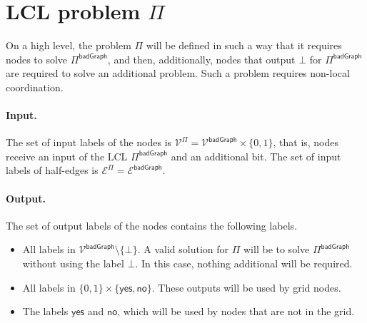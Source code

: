 \documentclass[11pt]{article}
\newcommand{\lbadgraph}{\mathsf {badGraph}}
\newcommand{\lyes}{\mathsf {yes}}
\newcommand{\lno}{\mathsf {no}}
\begin{document}
\section{LCL problem \texorpdfstring{\boldmath$\Pi$}{Pi}}\label{sec:problem-pi}
On a high level, the problem $\Pi$ will be defined in such a way that it requires nodes to solve $\Pi^{\lbadgraph}$, and then, additionally, nodes that output $\bot$ for $\Pi^{\lbadgraph}$ are required to solve an additional problem. Such a problem requires non-local coordination.

\paragraph{Input.}
The set of input labels of the nodes is $\mathcal{V}^\Pi=\mathcal{V^\lbadgraph}\times \{0,1\}$, that is, nodes receive an input of the LCL $\Pi^\lbadgraph$ and an additional bit. The set of input labels of half-edges is $\mathcal{E}^\Pi=\mathcal{E^\lbadgraph}$. 

\paragraph{Output.}
The set of output labels of the nodes contains the following labels.
\begin{itemize}
	\item All labels in $\mathcal{V^\lbadgraph}\setminus\{\bot\}$. A valid solution for $\Pi$ will be to solve $\Pi^{\lbadgraph}$ without using the label $\bot$. In this case, nothing additional will be required.
	\item All labels in $\{0,1\} \times \{\lyes,\lno\}$. These outputs will be used by grid nodes.
	\item The labels $\lyes$ and $\lno$, which will be used by nodes that are not in the grid.
\end{itemize} 
\end{document}
